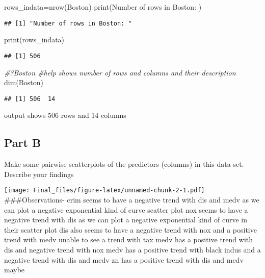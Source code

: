 \documentclass[
]{article}
\newenvironment{Shaded}{\begin{snugshade}}{\end{snugshade}}
\newcommand{\CommentTok}[1]{\textcolor[rgb]{0.56,0.35,0.01}{\textit{#1}}}
\newcommand{\FunctionTok}[1]{\textcolor[rgb]{0.00,0.00,0.00}{#1}}
\newcommand{\NormalTok}[1]{#1}
\newcommand{\OtherTok}[1]{\textcolor[rgb]{0.56,0.35,0.01}{#1}}
\newcommand{\StringTok}[1]{\textcolor[rgb]{0.31,0.60,0.02}{#1}}
\begin{document}
\begin{Shaded}
\begin{Highlighting}[]
\NormalTok{rows\_indata}\OtherTok{=}\FunctionTok{nrow}\NormalTok{(Boston)}
\FunctionTok{print}\NormalTok{(}\StringTok{\textquotesingle{}Number of rows in Boston: \textquotesingle{}}\NormalTok{)}
\end{Highlighting}
\end{Shaded}

\begin{verbatim}
## [1] "Number of rows in Boston: "
\end{verbatim}

\begin{Shaded}
\begin{Highlighting}[]
\FunctionTok{print}\NormalTok{(rows\_indata)}
\end{Highlighting}
\end{Shaded}

\begin{verbatim}
## [1] 506
\end{verbatim}

\begin{Shaded}
\begin{Highlighting}[]
\CommentTok{\#?Boston \#help shows number of rows and columns and their description}
\FunctionTok{dim}\NormalTok{(Boston) }
\end{Highlighting}
\end{Shaded}

\begin{verbatim}
## [1] 506  14
\end{verbatim}

output shows 506 rows and 14 columns

\hypertarget{part-b}{%
\subsection{Part B}\label{part-b}}

Make some pairwise scatterplots of the predictors (columns) in this data
set. Describe your findings

\texttt{[image: Final\_files/figure-latex/unnamed-chunk-2-1.pdf]}
\#\#\#Observations- crim seems to have a negative trend with dis and
medv as we can plot a negative exponential kind of curve scatter plot
nox seems to have a negative trend with dis as we can plot a negative
exponential kind of curve in their scatter plot dis also seems to have a
negative trend with nox and a positive trend with medv unable to see a
trend with tax medv has a positive trend with dis and negative trend
with nox medv has a positive trend with black indus and a negative trend
with dis and medv zn has a positive trend with dis and medv maybe
\end{document}
